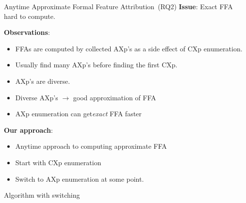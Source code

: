 \begin{frame}{Anytime Approximate Formal Feature Attribution~(RQ2)}
	\textbf{Issue}: Exact FFA hard to compute.

	\textbf{Observations}: 
	\begin{itemize}
		\item FFAs are computed by collected AXp's as a side effect of CXp
	enumeration.
		\item Usually find many AXp’s before finding the first CXp. 

		\item AXp’s are diverse. %
		
		\item Diverse AXp's $\rightarrow$ good approximation of FFA

		\item AXp enumeration can get\emph{exact} FFA faster%
	\end{itemize}
	
	\textbf{Our approach}: 
		\begin{itemize}
			\item Anytime approach to computing approximate FFA
			\item Start with CXp enumeration
			\item Switch to AXp enumeration at some point.
		\end{itemize}

\end{frame}

\begin{frame}{Algorithm with switching}
	
\end{frame}


